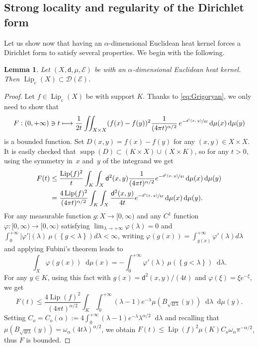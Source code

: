 \documentclass[JEP,XML,SOM,Unicode,published]{cedram}
\newcommand\mto{\mathchoice{\longmapsto}{\mapsto}{\mapsto}{\mapsto}}
\newcommand{\rmc}{\mathrm{c}}
\let\sep:
\theoremstyle{plain}
\newtheorem{lemma}[theorem]{Lemma}
\theoremstyle{definition}
\newcommand{\cE}{\mathcal{E}}
\newcommand{\cD}{\mathcal{D}}
\let\phi\varphi
\newcommand{\di}{\mathop{}\!\mathrm{d}}
\DeclareMathOperator{\supp}{supp}
\DeclareMathOperator{\Lip}{Lip}
\newcommand{\dist}{\mathsf{d}}
\begin{document}
\subsection{Strong locality and regularity of the Dirichlet form}

Let us show now that having an $\alpha$-dimensional Euclidean heat kernel forces a Dirichlet form to satisfy several properties. We begin with the following.

\begin{lemma}\label{lem:lipinD}
Let $(X,\dist,\mu,\cE)$ be with an $\alpha$-dimensional Euclidean heat kernel. Then $\Lip_\rmc(X) \subset \cD(\cE)$.
\end{lemma}

\begin{proof}
Let $f \in \Lip_\rmc(X)$ be with support $K$. Thanks to \eqref{eq:Grigoryan}, we only need to show that
\[
F \sep (0,+\infty) \ni t \mto \frac{1}{2t} \iint_{X\times X} (f(x)-f(y))^2 \frac{1}{(4 \pi t)^{\alpha/2}}\, e^{-\sfrac{\dist^2(x,y)}{4t}} \di \mu(x) \di \mu(y)
\]
is a bounded function. Set $D(x,y)=f(x)-f(y)$ for any $(x,y) \in X \times X$. It is easily checked that $\supp(D) \subset (K \times X) \cup (X \times K)$, so for any $t>0$, using the symmetry in~$x$ and~$y$ of the integrand we get
\begin{align*}
F(t) & \le \frac{\Lip(f)^2}{t} \int_K\int_X \dist^2(x,y) \frac{1}{(4 \pi t)^{\alpha/2}} e^{-\sfrac{\dist^2(x,y)}{4t}} \di \mu(x) \di \mu(y)\\
& = \frac{4 \Lip(f)^2}{(4 \pi t)^{\alpha/2}} \int_K \int_X \frac{\dist^2(x,y)}{4t} e^{-\sfrac{\dist^2(x,y)}{4t}} \di \mu(x) \di \mu(y).
\end{align*}
For any measurable function $g:X\to [0,\infty)$ and any $C^1$ function $\phi: [0,\infty) \to[0,\infty)$ satisfying $\lim_{\lambda\to+\infty}\varphi(\lambda)=0$ and $\int_0^{+\infty} |\varphi'|(\lambda)\ \mu\left(\left\{g<\lambda\right\}\right)d\lambda<\infty$, writing $\varphi(g(x))=\int_{g(x)}^{+\infty} \varphi'(\lambda)d\lambda$ and applying Fubini's theorem leads to
\begin{equation}\label{eq:Fub}
\int_X \varphi(g(x))\di\mu(x)=-\int_0^{+\infty} \varphi'(\lambda)\ \mu\left(\left\{g<\lambda\right\}\right)\di\lambda.
\end{equation}
For any $y \in K$, using this fact with $g(x)=\dist^2(x,y)/(4t)$ and $\phi(\xi)=\xi e^{-\xi}$, we get
\[
F(t) \le \frac{4 \Lip(f)^2}{(4 \pi t)^{\alpha/2}} \int_K \int_0^{+\infty} (\lambda - 1) e^{-\lambda} \mu(B_{\sqrt{4 t \lambda}}(y)) \di \lambda \di \mu(y).
\]
Setting $C_o=C_o(\alpha):=4 \int_0^{+\infty}(\lambda-1)e^{-\lambda}\lambda^{\alpha/2} \di \lambda$ and recalling that $\mu(B_{\sqrt{4 t \lambda}}(y))= \omega_{\alpha} (4 t \lambda)^{\alpha/2}$, we obtain $F(t) \le \Lip(f)^2 \mu(K) C_o \omega_{\alpha} \pi^{-\alpha/2}$, thus $F$ is bounded.
\end{proof}
\end{document}

